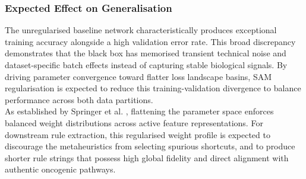 \subsubsection{Expected Effect on Generalisation}
\label{ssub:method_sam_generalisation}
The unregularised baseline network characteristically produces exceptional training 
accuracy alongside a high validation error rate. This broad discrepancy demonstrates 
that the black box has memorised transient technical noise and dataset-specific batch 
effects instead of capturing stable biological signals. By driving parameter convergence 
toward flatter loss landscape basins, SAM regularisation is expected to reduce this 
training-validation divergence to balance performance across both data partitions. 
\\
As established by Springer et al. \cite{Springer2024}, flattening the parameter space 
enforces balanced weight distributions across active feature representations. For downstream 
rule extraction, this regularised weight profile is expected to discourage the metaheuristics from selecting 
spurious shortcuts, and to produce shorter rule strings that possess high global fidelity 
and direct alignment with authentic oncogenic pathways.